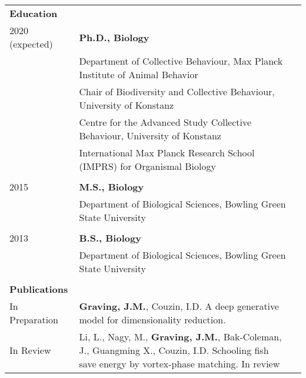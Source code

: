 \documentclass[letterpaper,7pt,oneside]{article}
\begin{document}
\begin{small}
\noindent \begin{longtable}{@{} l p{5.3in}l}



\Large{\textbf{Education}} \vspace{5mm} \\
 \large{2020 (expected)} 
 & \textbf{Ph.D., Biology} \\
 & {Department of Collective Behaviour, Max Planck Institute of Animal Behavior} \\
  & {Chair of Biodiversity and Collective Behaviour, University of Konstanz} \\
    & {Centre for the Advanced Study Collective Behaviour, University of Konstanz} \\
 	& {International Max Planck Research School (IMPRS) for Organismal Biology} \\
     
     & \\
 \large{2015} 
  & \textbf{M.S., Biology} \\
     & {Department of Biological Sciences, Bowling Green State University} \\
    
     & \\
 \large{2013} 
  &\textbf{B.S., Biology} \\
      & {Department of Biological Sciences, Bowling Green State University} \\
    
     & \\
 \Large{\textbf{Publications}}  \vspace{5mm} \\
\large{In Preparation}
& \textbf{Graving, J.M.}, Couzin, I.D.  A deep generative model for dimensionality reduction. \vspace{1mm} \\
\large{In Review}
& Li, L., Nagy, M., \textbf{Graving, J.M.}, Bak-Coleman, J., Guangming X., Couzin, I.D. Schooling fish save energy by vortex-phase matching. In review \vspace{1mm} \\


\end{longtable}
\end{small}
\end{document}
